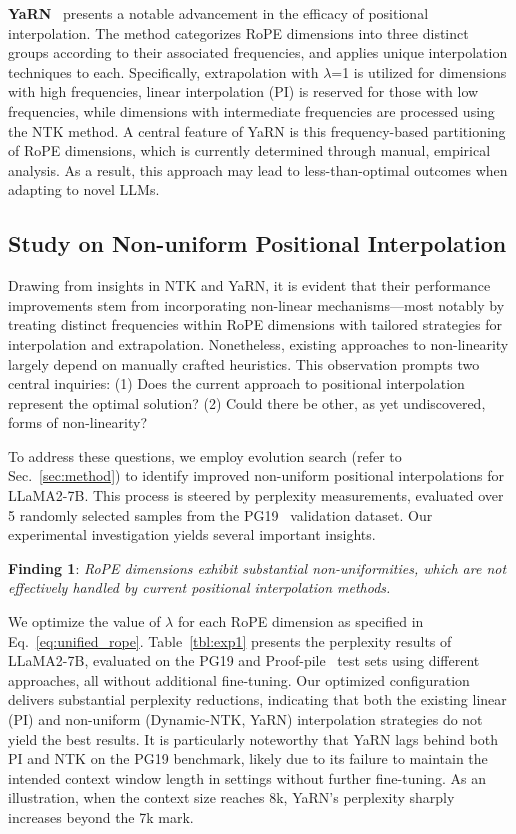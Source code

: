 \textbf{YaRN}~\cite{yarn} presents a notable advancement in the efficacy of positional interpolation. The method categorizes RoPE dimensions into three distinct groups according to their associated frequencies, and applies unique interpolation techniques to each. Specifically, extrapolation with $\lambda$=1 is utilized for dimensions with high frequencies, linear interpolation (PI) is reserved for those with low frequencies, while dimensions with intermediate frequencies are processed using the NTK method. A central feature of YaRN is this frequency-based partitioning of RoPE dimensions, which is currently determined through manual, empirical analysis. As a result, this approach may lead to less-than-optimal outcomes when adapting to novel LLMs.

\subsection{Study on Non-uniform Positional Interpolation}

Drawing from insights in NTK and YaRN, it is evident that their performance improvements stem from incorporating non-linear mechanisms—most notably by treating distinct frequencies within RoPE dimensions with tailored strategies for interpolation and extrapolation. Nonetheless, existing approaches to non-linearity largely depend on manually crafted heuristics. This observation prompts two central inquiries: (1) Does the current approach to positional interpolation represent the optimal solution? (2) Could there be other, as yet undiscovered, forms of non-linearity?

To address these questions, we employ evolution search (refer to Sec.~\ref{sec:method}) to identify improved non-uniform positional interpolations for LLaMA2-7B. This process is steered by perplexity measurements, evaluated over 5 randomly selected samples from the PG19~\cite{pg19} validation dataset. Our experimental investigation yields several important insights.

\textbf{Finding 1}: \textit{RoPE dimensions exhibit substantial non-uniformities, which are not effectively handled by current positional interpolation methods.}

We optimize the value of $\lambda$ for each RoPE dimension as specified in Eq.~\ref{eq:unified_rope}. Table~\ref{tbl:exp1} presents the perplexity results of LLaMA2-7B, evaluated on the PG19 and Proof-pile~\cite{proof-pile} test sets using different approaches, all without additional fine-tuning. Our optimized configuration delivers substantial perplexity reductions, indicating that both the existing linear (PI) and non-uniform (Dynamic-NTK, YaRN) interpolation strategies do not yield the best results. It is particularly noteworthy that YaRN lags behind both PI and NTK on the PG19 benchmark, likely due to its failure to maintain the intended context window length in settings without further fine-tuning. As an illustration, when the context size reaches 8k, YaRN’s perplexity sharply increases beyond the 7k mark.

